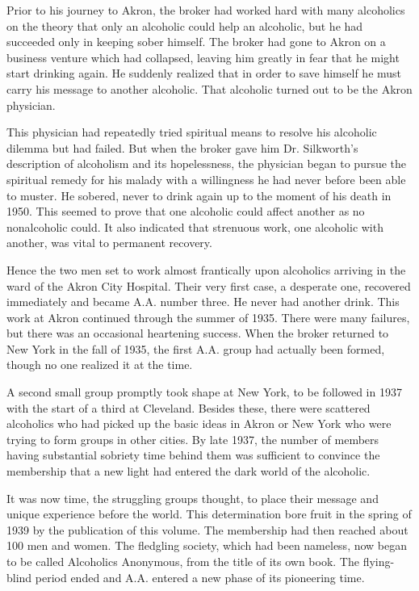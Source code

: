 \begin{biblechapter}
    Prior to his journey to Akron, 
    the broker had worked hard with many alcoholics 
    on the theory that only an alcoholic could help an alcoholic, 
    but he had succeeded only in keeping sober himself. 
\verse The broker had gone to Akron on a business venture 
    which had collapsed, 
    leaving him greatly in fear that he might start drinking again. 
\verse He suddenly realized that in order to save himself 
    he must carry his message to another alcoholic. 
\verse That alcoholic turned out to be the Akron physician.

\verse This physician had repeatedly tried spiritual means 
    to resolve his alcoholic dilemma but had failed. 
\verse But when the broker gave him Dr. Silkworth’s description 
    of alcoholism and its hopelessness, 
    the physician began to pursue the spiritual remedy for his malady 
    with a willingness he had never before been able to muster.
\verse He sobered, never to drink again 
    up to the moment of his death in 1950. 
\verse This seemed to prove that one alcoholic could affect another 
    as no nonalcoholic could. %
\verse It also indicated that strenuous work, 
    one alcoholic with another, 
    was vital to permanent recovery.

    Hence the two men set to work almost frantically 
    upon alcoholics arriving in the ward of the Akron City Hospital. 
\verse Their very first case, a desperate one, 
    recovered immediately and became A.A. number three.
\verse He never had another drink.
\verse This work at Akron continued through the summer of 1935.
\verse There were many failures, 
    but there was an occasional heartening success.
\verse When the broker returned to New York in the fall of 1935, 
    the first A.A. group had actually been formed, 
    though no one realized it at the time.

\verse A second small group promptly took shape at New York, 
    to be followed in 1937 with the start of a third at Cleveland. 
\verse Besides these, there were scattered alcoholics 
    who had picked up the basic ideas in Akron or New York 
    who were trying to form groups in other cities. 
\verse By late 1937, 
    the number of members having substantial sobriety time behind them 
    was sufficient to convince the membership that 
    a new light had entered the dark world of the alcoholic.

    It was now time, the struggling groups thought, 
    to place their message and unique experience before the world. 
\verse This determination bore fruit in the spring of 1939 
    by the publication of this volume. 
\verse The membership had then reached about 100 men and women. 
\verse The fledgling society, 
    which had been nameless, 
    now began to be called Alcoholics Anonymous, 
    from the title of its own book. 
\verse The flying-blind period ended 
    and A.A. entered a new phase of its pioneering time.


\end{biblechapter}
